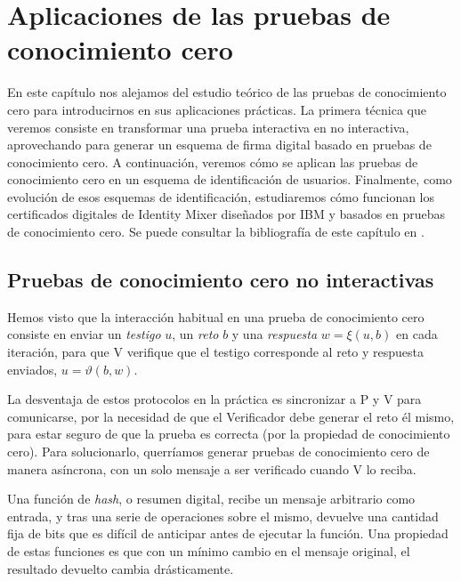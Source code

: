 

\chapter{Aplicaciones de las pruebas de conocimiento cero}\label{ch:aplicaciones} 


En este capítulo nos alejamos del estudio teórico de las pruebas de conocimiento cero para introducirnos en sus aplicaciones prácticas. La primera técnica que veremos consiste en transformar una prueba interactiva en no interactiva, aprovechando para generar un esquema de firma digital basado en pruebas de conocimiento cero. A continuación, veremos cómo se aplican las pruebas de conocimiento cero en un esquema de identificación de usuarios. Finalmente, como evolución de esos esquemas de identificación, estudiaremos cómo funcionan los certificados digitales de Identity Mixer diseñados por IBM y basados en pruebas de conocimiento cero. Se puede consultar la bibliografía de este capítulo en \citep{menezes1996handbook,stinson2005cryptography,idemixSpec}.



\section{Pruebas de conocimiento cero no interactivas}

Hemos visto que la interacción habitual en una prueba de conocimiento cero consiste en enviar un \textit{testigo} $u$, un \textit{reto} $b$ y una \textit{respuesta} $w=\xi(u,b)$ en cada iteración, para que V verifique que el testigo corresponde al reto y respuesta enviados, $u=\vartheta(b,w)$.

La desventaja de estos protocolos en la práctica es sincronizar a P y V para comunicarse, por la necesidad de que el Verificador debe generar el reto él mismo, para estar seguro de que la prueba es correcta (por la propiedad de conocimiento cero). Para solucionarlo, querríamos generar pruebas de conocimiento cero de manera asíncrona, con un solo mensaje a ser verificado cuando V lo reciba. 

Una función de \textit{hash}, o resumen digital, recibe un mensaje arbitrario como entrada, y tras una serie de operaciones sobre el mismo, devuelve una cantidad fija de bits que es difícil de anticipar antes de ejecutar la función. Una propiedad de estas funciones es que con un mínimo cambio en el mensaje original, el resultado devuelto cambia drásticamente.

